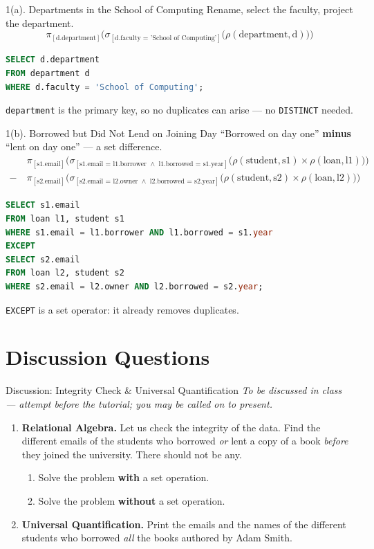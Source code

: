 \documentclass{beamer}
\newcommand\proj[1]{\pi_{[\text{#1}]}}
\newcommand\sel[1]{\sigma_{[\text{#1}]}}
\newcommand\ren[2]{\rho(\text{#1},\text{#2})}
\begin{document}
\begin{frame}[fragile]{1(a). Departments in the School of Computing}
\small
Rename, select the faculty, project the department.
\[
\proj{d.department}\Big(\sel{d.faculty = 'School of Computing'}\big(\ren{department}{d}\big)\Big)
\]
\begin{lstlisting}[language=SQL]
SELECT d.department
FROM department d
WHERE d.faculty = 'School of Computing';
\end{lstlisting}
\texttt{department} is the primary key, so no duplicates can arise --- no \texttt{DISTINCT} needed.
\end{frame}

\begin{frame}[fragile]{1(b). Borrowed but Did Not Lend on Joining Day}
\footnotesize
``Borrowed on day one'' \textbf{minus} ``lent on day one'' --- a set difference.
\[
\begin{aligned}
&\proj{s1.email}\Big(\sel{s1.email = l1.borrower $\wedge$ l1.borrowed = s1.year}\big(\ren{student}{s1} \times \ren{loan}{l1}\big)\Big)\\
-\ &\proj{s2.email}\Big(\sel{s2.email = l2.owner $\wedge$ l2.borrowed = s2.year}\big(\ren{student}{s2} \times \ren{loan}{l2}\big)\Big)
\end{aligned}
\]
\begin{lstlisting}[language=SQL]
SELECT s1.email
FROM loan l1, student s1
WHERE s1.email = l1.borrower AND l1.borrowed = s1.year
EXCEPT
SELECT s2.email
FROM loan l2, student s2
WHERE s2.email = l2.owner AND l2.borrowed = s2.year;
\end{lstlisting}
\texttt{EXCEPT} is a set operator: it already removes duplicates.
\end{frame}

\section{Discussion Questions}

\begin{frame}{Discussion: Integrity Check \& Universal Quantification}
\small
\textit{To be discussed in class --- attempt before the tutorial; you may be called on to present.}
\begin{enumerate}
  \item[\textbf{2.}] \textbf{Relational Algebra.} Let us check the integrity of the data. Find the different emails of the students who borrowed \emph{or} lent a copy of a book \emph{before} they joined the university. There should not be any.
  \begin{enumerate}
    \item[(a)] Solve the problem \textbf{with} a set operation.
    \item[(b)] Solve the problem \textbf{without} a set operation.
  \end{enumerate}
  \item[\textbf{3.}] \textbf{Universal Quantification.} Print the emails and the names of the different students who borrowed \emph{all} the books authored by Adam Smith.
\end{enumerate}
\end{frame}
\end{document}
